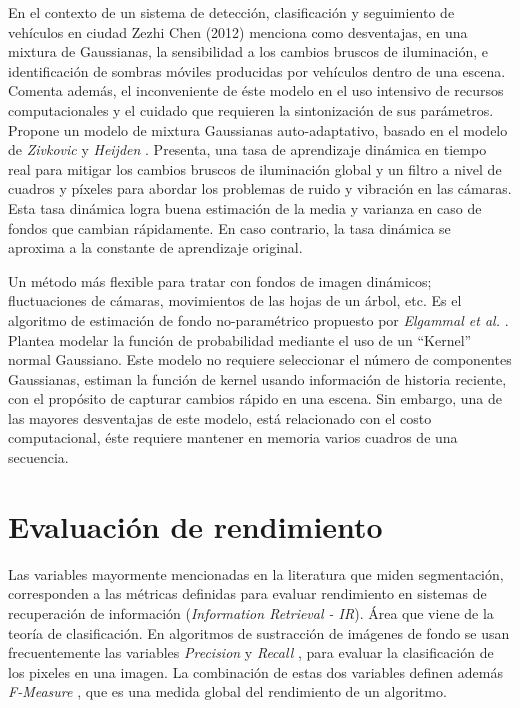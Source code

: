 \indent En el contexto de un sistema de detección, clasificación y seguimiento de vehículos en ciudad  Zezhi Chen \cite{chen_vehicle_2012} (2012) menciona como desventajas, en una mixtura de Gaussianas, la sensibilidad a los cambios bruscos de iluminación, e identificación de sombras móviles producidas por vehículos dentro de una escena. Comenta además, el inconveniente de éste modelo en el uso intensivo de recursos computacionales y el cuidado que requieren la sintonización de sus parámetros. Propone un modelo de mixtura Gaussianas auto-adaptativo, basado en el modelo de \textit{Zivkovic} y \textit{Heijden} \cite{zivkovic_efficient_2006}. Presenta, una tasa de aprendizaje dinámica en tiempo real para mitigar los cambios bruscos de iluminación global y un filtro a nivel de cuadros y píxeles para abordar los problemas de ruido y vibración en las cámaras. Esta tasa dinámica logra buena estimación de la media y varianza en caso de fondos que cambian rápidamente. En caso contrario, la tasa dinámica se aproxima a la constante de aprendizaje original\cite{zivkovic_efficient_2006}.

\indent Un método más flexible para tratar con fondos de imagen dinámicos; fluctuaciones de cámaras, movimientos de las hojas de un árbol, etc. Es el algoritmo de estimación de fondo no-paramétrico propuesto por \textit{Elgammal et al.} \cite{elgammal_nonparametricmodel_2000}. Plantea modelar la función de probabilidad mediante el uso de un ``Kernel'' normal Gaussiano. Este modelo no requiere seleccionar el número de componentes Gaussianas, estiman la función de kernel usando información de historia reciente, con el propósito de capturar cambios rápido en una escena. Sin embargo, una de las mayores desventajas de este modelo, está relacionado con el costo computacional, éste requiere mantener en memoria varios cuadros de una secuencia.


\section{Evaluación de rendimiento}

\indent Las variables mayormente mencionadas en la literatura que miden segmentación, corresponden a las métricas definidas para evaluar rendimiento en sistemas de recuperación de información (\textit{Information Retrieval - IR}). Área que viene de la teoría de clasificación. En algoritmos de sustracción de imágenes de fondo se usan frecuentemente las variables \textit{Precision} y \textit{Recall} \cite{prati_detecting_2003, benezeth_review_2008}, para evaluar la clasificación de los pixeles en una imagen. La combinación de estas dos variables definen además \textit{F-Measure} \cite{herrero_background_2009}, que es una medida global del rendimiento de un algoritmo.

